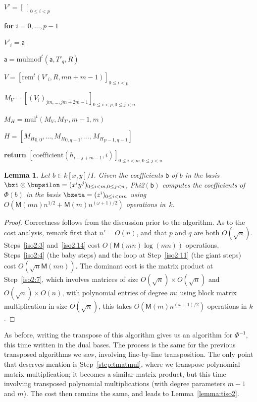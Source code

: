 \documentclass{sig-alternate}
\def\M {\ensuremath{\mathsf{M}}}
\def\va {\ensuremath{\mathsf{a}}}
\def\vb {\ensuremath{\mathsf{b}}}
\def\mul {\ensuremath{\mathrm{mul}}}
\def\rem {\ensuremath{\mathrm{rem}}}
\def\coeff {\ensuremath{\mathrm{coefficient}}}
\def\mulmod {\ensuremath{\mathrm{mulmod}}}
\newcounter{algo}
\newenvironment{algorithm_endline}[4]{\small\begin{center}\begin{minipage}{0.48\textwidth}
      \refstepcounter{algo}
      \label{#4}
      \sf
      \rule{\textwidth}{0.2pt}\\
      \makebox[\textwidth][c]{Algorithm~\arabic{algo}:~\textbf{#1}}\\
      \rule[0.5\baselineskip]{\textwidth}{0.2pt}\\

      \vspace{-12pt}

      \parbox{\textwidth}{\textbf{Input} #2}
      \parbox{\textwidth}{\textbf{Output} #3}

\vspace{-7pt}

      \begin{enumerate*}}{\end{enumerate*}
      \vspace{-11pt}
      \rule{\textwidth}{0.2pt}
\end{minipage}\end{center}
}
\newtheorem{Lemma}{Lemma}
\begin{document}
\begin{algofloat}[t]
\begin{algorithm_endline}
\item $V'=[\ ]_{0 \le i < p}$
\item {\bf for} {$i=0,\dots,p-1$}
\item \hspace{7mm} $V'_i = \va$
\item \hspace{7mm} $\va = \mulmod^t(\va,T'_q,R)$
\item $V = [\rem^t(V'_i,R,mn+m-1)]_{0 \le i < p}$
\item $M_V = [(V_{i})_{jm,\dots,jm+2m-1}]_{0 \le i < p, 0 \le j < n}$
\item\label{step:tmatmul} $M_H = \mul^t(M_V, M_{T'},m-1,m)$
\item $H=[{M_H}_{0,0},\dots,{M_H}_{0,q-1},\dots,{M_H}_{p-1,q-1}]$
\item {\bf return} $[\coeff(h_{i-j+m-1},i)]_{0 \le i < m, 0 \le j < n}$
  \end{algorithm_endline}
\vspace{-5ex}
\end{algofloat}

\begin{Lemma}
  Let $b \in k[x,y]/I$. Given the coefficients $\vb$ of $b$ in the
  basis $\bxi \otimes \bupsilon=(x^i y^j)_{0 \le i < m, 0 \le j < n}$,
  {\sf Phi2}$(\vb)$ computes the coefficients of $\Phi(b)$ in the
  basis $\bzeta=(z^i)_{0 \le i < mn}$ using $O(\M(mn)n^{1/2}+\M(m)
  n^{(\omega+1)/2} )$ operations in~$k$.
\end{Lemma}
\begin{proof}
  Correctness follows from the discussion prior to the algorithm.  As
  to the cost analysis, remark first that $n'=O(n)$, and that $p$ and
  $q$ are both $O(\sqrt{n})$. Steps~\ref{iso2:3} and~\ref{iso2:14}
  cost $O(\M(mn)\log(mn))$ operations. Steps~\ref{iso2:4} (the baby
  steps) and the loop at Step~\ref{iso2:11} (the giant steps) cost
  $O(\sqrt{n}\M(mn))$. The dominant cost is the matrix product at
  Step~\ref{iso2:7}, which involves matrices of size $O(\sqrt{n})
  \times O(\sqrt{n})$ and $O(\sqrt{n}) \times O(n)$, with polynomial
  entries of degree $m$: using block matrix multiplication in size
  $O(\sqrt{n})$, this takes $O(\M(m) n^{(\omega+1)/2})$ operations in
  $k$.
\end{proof}

As before, writing the transpose of this algorithm gives us an
algorithm for $\Phi^{-1}$, this time written in the dual bases.  The
process is the same for the previous transposed algorithms we saw,
involving line-by-line transposition. The only point that deserves
mention is Step~\ref{step:tmatmul}, where we transpose polynomial
matrix multiplication; it becomes a similar matrix product, but this
time involving transposed polynomial multiplications (with degree
parameters $m-1$ and $m$). The cost then remains the same, and leads to
Lemma~\ref{lemma:tiso2}.
\end{document}
